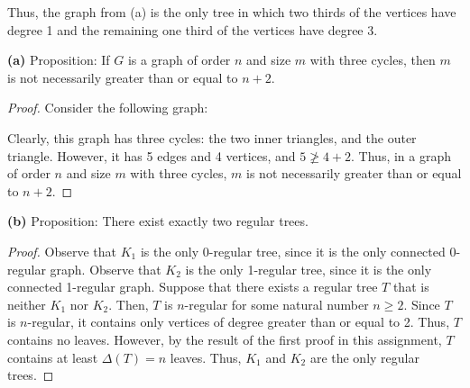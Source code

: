 \documentclass[12pt]{article}
\begin{document}
Thus, the graph from (a) is the only tree in which two thirds of the vertices have degree 1 and the remaining one third of the vertices have degree 3.

\newpage{}

{\bf (a)} Proposition: If $G$ is a graph of order $n$ and size $m$ with three cycles, then $m$ is not necessarily greater than or equal to $n+2$.
\begin{proof}
    Consider the following graph:
    \begin{center}
    \end{center}
    Clearly, this graph has three cycles: the two inner triangles, and the outer triangle.
    However, it has 5 edges and 4 vertices, and $5 \not \geq 4+2$.
    Thus, in a graph of order $n$ and size $m$ with three cycles, $m$ is not necessarily greater than or equal to $n+2$.
\end{proof}

{\bf (b)} Proposition: There exist exactly two regular trees.
\begin{proof}
    Observe that $K_1$ is the only 0-regular tree, since it is the only connected 0-regular graph. %
    Observe that $K_2$ is the only 1-regular tree, since it is the only connected 1-regular graph. %
    Suppose that there exists a regular tree $T$ that is neither $K_1$ nor $K_2$.
    Then, $T$ is $n$-regular for some natural number $n \geq 2$.
    Since $T$ is $n$-regular, it contains only vertices of degree greater than or equal to 2.
    Thus, $T$ contains no leaves.
    However, by the result of the first proof in this assignment, $T$ contains at least $\Delta(T) = n$ leaves.
    Thus, $K_1$ and $K_2$ are the only regular trees.
\end{proof}
\end{document}
